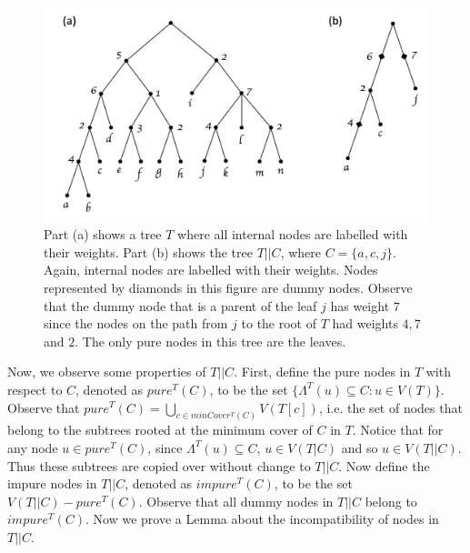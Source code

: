 \documentclass[12pt,a4paper]{article}
\newcommand{\leafset}{\Lambda}
\begin{document}
    \begin{figure}[ht]
        \includegraphics[scale=0.5]{dummynodes}
        \centering
        \caption[Constructing the tree $T||C$]{Part (a) shows a tree $T$ where all internal nodes are labelled with their weights. Part (b) shows the tree $T||C$, where $C = \{a, c, j\}$. Again, internal nodes are labelled with their weights. Nodes represented by diamonds in this figure are dummy nodes. Observe that the dummy node that is a parent of the leaf $j$ has weight $7$ since the nodes on the path from $j$ to the root of $T$ had weights $4, 7$ and $2$. The only pure nodes in this tree are the leaves.}
        \label{fig:dummynodes}
    \end{figure}

    Now, we observe some properties of $T||C$. First, define the pure nodes in $T$ with respect to $C$, denoted as $pure^{T}(C)$, to be the set $\{\leafset^{T}(u) \subseteq C : u \in V(T)\}$. Observe that $pure^{T}(C) = \bigcup_{c \in minCover^{T}(C)} V(T[c])$, i.e. the set of nodes that belong to the subtrees rooted at the minimum cover of $C$ in $T$. Notice that for any node $u \in pure^{T}(C)$, since $\leafset^{T}(u) \subseteq C$, $u \in V(T|C)$ and so $u \in V(T||C)$. Thus these subtrees are copied over without change to $T||C$. Now define the impure nodes in $T||C$, denoted as $impure^{T}(C)$, to be the set $V(T||C) - pure^{T}(C)$. Observe that all dummy nodes in $T||C$ belong to $impure^{T}(C)$. Now we prove a Lemma about the incompatibility of nodes in $T||C$.
    \newline
\end{document}

